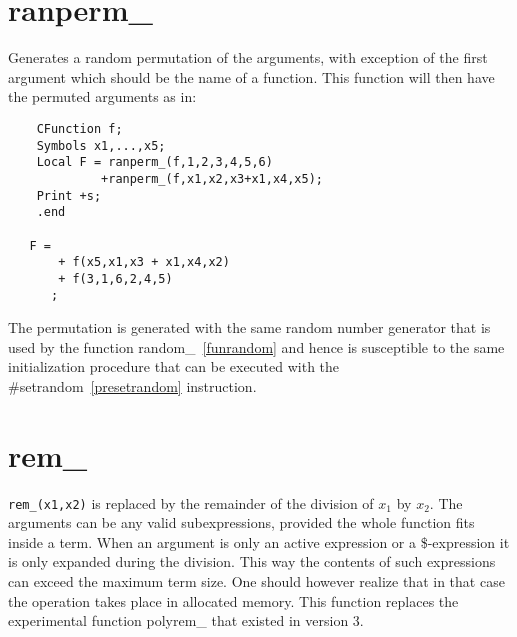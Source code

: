 \section{ranperm\_}
\label{funranperm}
\noindent Generates a random permutation of the arguments, with exception 
of the first argument which should be the name of a function. This function 
will then have the permuted arguments as in:
\begin{verbatim}
    CFunction f;
    Symbols x1,...,x5;
    Local F = ranperm_(f,1,2,3,4,5,6)
             +ranperm_(f,x1,x2,x3+x1,x4,x5);
    Print +s;
    .end

   F =
       + f(x5,x1,x3 + x1,x4,x2)
       + f(3,1,6,2,4,5)
      ;
\end{verbatim}
The permutation is generated with the same random number generator that is 
used by the function 
random\_~\ref{funrandom} and hence 
is susceptible to the same initialization procedure that can be executed 
with the \#setrandom~\ref{presetrandom} instruction.


\section{rem\_}
\label{funrem}
\noindent \verb:rem_(x1,x2): is replaced by the remainder of the division 
of $x_1$ by $x_2$. The arguments can be any valid subexpressions, provided 
the whole function fits inside a term. When an argument is only an active 
expression or a \$-expression it is only expanded during the division. This 
way the contents of such expressions can exceed the maximum term size. One 
should however realize that in that case the operation takes place in 
allocated memory.
This function replaces the experimental function 
polyrem\_ that existed in 
version 3.


